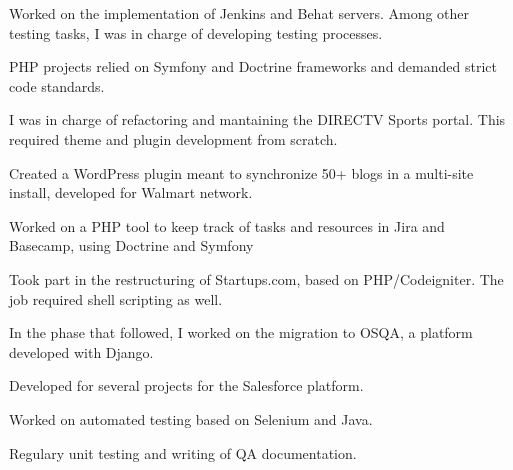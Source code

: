 \documentclass[]{deedy-resume-openfont}
\begin{document}
\begin{minipage}[t]{0.66\textwidth}


\begin{tightemize}
\item Worked on the implementation of Jenkins and Behat servers. Among other testing tasks, I was in charge of developing testing processes.
\item PHP projects relied on Symfony and Doctrine frameworks and demanded strict code standards.
\end{tightemize}

\sectionsep



\begin{tightemize}
\item I was in charge of refactoring and mantaining the DIRECTV Sports portal. This required theme and plugin development from scratch.
\item Created a WordPress plugin meant to synchronize 50+ blogs in a multi-site install, developed for Walmart network.
\item Worked on a PHP tool to keep track of tasks and resources in Jira and Basecamp, using Doctrine and Symfony
\end{tightemize}

\sectionsep



\begin{tightemize}
\item Took part in the restructuring of Startups.com, based on PHP/Codeigniter. The job required shell scripting as well.
\item In the phase that followed, I worked on the migration to OSQA, a platform developed with Django.
\end{tightemize}

\sectionsep



\begin{tightemize}
\item Developed for several projects for the Salesforce platform.
\item Worked on automated testing based on Selenium and Java.
\item Regulary unit testing and writing of QA documentation.
\end{tightemize}
\sectionsep

\end{minipage} 
\end{document}
